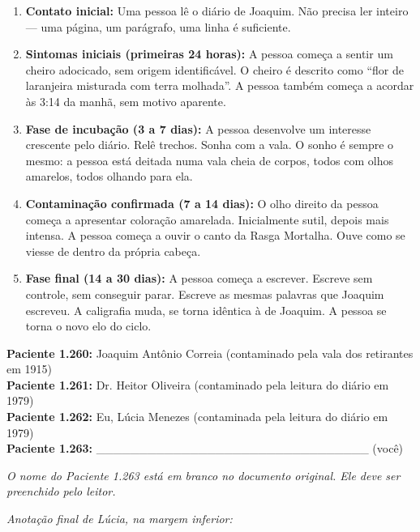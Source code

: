 \begin{enumerate}
    \item \textbf{Contato inicial:} Uma pessoa lê o diário de Joaquim. Não precisa ler inteiro --- uma página, um parágrafo, uma linha é suficiente.
    \item \textbf{Sintomas iniciais (primeiras 24 horas):} A pessoa começa a sentir um cheiro adocicado, sem origem identificável. O cheiro é descrito como ``flor de laranjeira misturada com terra molhada''. A pessoa também começa a acordar às 3:14 da manhã, sem motivo aparente.
    \item \textbf{Fase de incubação (3 a 7 dias):} A pessoa desenvolve um interesse crescente pelo diário. Relê trechos. Sonha com a vala. O sonho é sempre o mesmo: a pessoa está deitada numa vala cheia de corpos, todos com olhos amarelos, todos olhando para ela.
    \item \textbf{Contaminação confirmada (7 a 14 dias):} O olho direito da pessoa começa a apresentar coloração amarelada. Inicialmente sutil, depois mais intensa. A pessoa começa a ouvir o canto da Rasga Mortalha. Ouve como se viesse de dentro da própria cabeça.
    \item \textbf{Fase final (14 a 30 dias):} A pessoa começa a escrever. Escreve sem controle, sem conseguir parar. Escreve as mesmas palavras que Joaquim escreveu. A caligrafia muda, se torna idêntica à de Joaquim. A pessoa se torna o novo elo do ciclo.
\end{enumerate}

\textbf{Paciente 1.260:} Joaquim Antônio Correia (contaminado pela vala dos retirantes em 1915) \\
\textbf{Paciente 1.261:} Dr. Heitor Oliveira (contaminado pela leitura do diário em 1979) \\
\textbf{Paciente 1.262:} Eu, Lúcia Menezes (contaminada pela leitura do diário em 1979) \\
\textbf{Paciente 1.263:} \_\_\_\_\_\_\_\_\_\_\_\_\_\_\_\_\_\_\_\_\_\_\_\_\_\_\_\_\_\_\_\_ (você)

\vspace{0.5em}

\noindent\textit{O nome do Paciente 1.263 está em branco no documento original. Ele deve ser preenchido pelo leitor.}

\vspace{1em}

\noindent\textit{Anotação final de Lúcia, na margem inferior:}

\vspace{0.5em}


